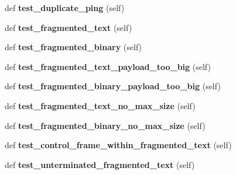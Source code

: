 \begin{DoxyCompactItemize}
def {\bfseries test\+\_\+duplicate\+\_\+ping} (self)
\item 
\mbox{\label{classwebsockets_1_1test__protocol_1_1_common_tests_a2837f6ff552f0d2b62fd9aec1c61b686}} 
def {\bfseries test\+\_\+fragmented\+\_\+text} (self)
\item 
\mbox{\label{classwebsockets_1_1test__protocol_1_1_common_tests_a686f0d3db5bb2d91c7704b7ee6200620}} 
def {\bfseries test\+\_\+fragmented\+\_\+binary} (self)
\item 
\mbox{\label{classwebsockets_1_1test__protocol_1_1_common_tests_ad01d867e73d8d1ffb58ae9043f1505ef}} 
def {\bfseries test\+\_\+fragmented\+\_\+text\+\_\+payload\+\_\+too\+\_\+big} (self)
\item 
\mbox{\label{classwebsockets_1_1test__protocol_1_1_common_tests_a325c0db935d53af7f8a1a1f593cb92e3}} 
def {\bfseries test\+\_\+fragmented\+\_\+binary\+\_\+payload\+\_\+too\+\_\+big} (self)
\item 
\mbox{\label{classwebsockets_1_1test__protocol_1_1_common_tests_a3262f02af976c25b304fe57931913504}} 
def {\bfseries test\+\_\+fragmented\+\_\+text\+\_\+no\+\_\+max\+\_\+size} (self)
\item 
\mbox{\label{classwebsockets_1_1test__protocol_1_1_common_tests_a5a1970613e1f8260d41a705de30b2c6d}} 
def {\bfseries test\+\_\+fragmented\+\_\+binary\+\_\+no\+\_\+max\+\_\+size} (self)
\item 
\mbox{\label{classwebsockets_1_1test__protocol_1_1_common_tests_afde25f80bf7a9945650f9120241296a2}} 
def {\bfseries test\+\_\+control\+\_\+frame\+\_\+within\+\_\+fragmented\+\_\+text} (self)
\item 
\mbox{\label{classwebsockets_1_1test__protocol_1_1_common_tests_ae5208b04d1ce7a51effbf9025740c7cd}} 
def {\bfseries test\+\_\+unterminated\+\_\+fragmented\+\_\+text} (self)

\end{DoxyCompactItemize}
